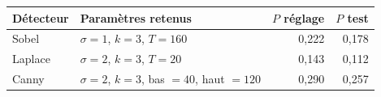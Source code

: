 \begin{center}\small
\begin{tabularx}{\linewidth}{lYrr}
\toprule
\textbf{Détecteur} & \textbf{Paramètres retenus} & \textbf{$P$ réglage} & \textbf{$P$ test} \\
\midrule
Sobel & $\sigma=1$, $k=3$, $T=160$ & 0,222 & 0,178 \\
Laplace & $\sigma=2$, $k=3$, $T=20$ & 0,143 & 0,112 \\
Canny & $\sigma=2$, $k=3$, bas $=40$, haut $=120$ & 0,290 & 0,257 \\
\bottomrule
\end{tabularx}
\end{center}
